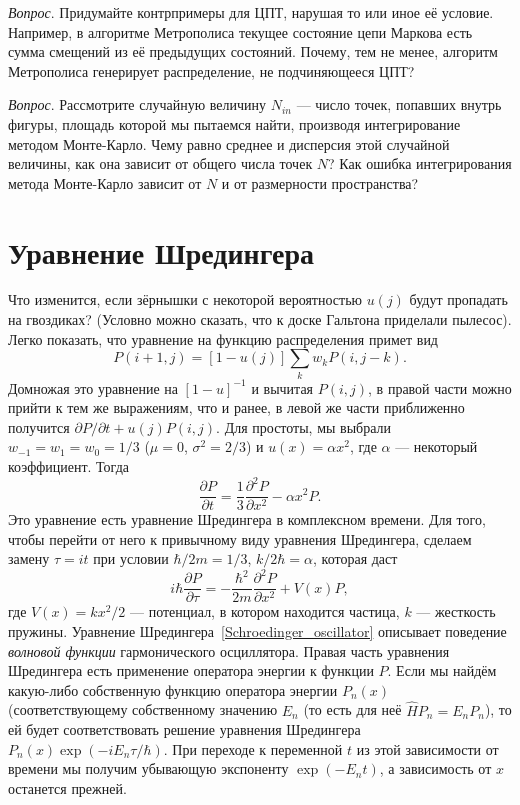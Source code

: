 \documentclass{book}
\begin{document}
\textit{Вопрос}. Придумайте контрпримеры для ЦПТ, нарушая то или иное её условие. Например, в
алгоритме Метрополиса текущее состояние цепи Маркова есть сумма смещений из её предыдущих
состояний. Почему, тем не менее, алгоритм Метрополиса генерирует распределение, не подчиняющееся
ЦПТ?

\textit{Вопрос}. Рассмотрите случайную величину $N_{in}$ --- число точек, попавших внутрь фигуры,
площадь которой мы пытаемся найти, производя интегрирование методом Монте-Карло. Чему равно среднее
и дисперсия этой случайной величины, как она зависит от общего числа точек $N$? Как ошибка
интегрирования метода Монте-Карло зависит от $N$ и от размерности пространства?

\section{Уравнение Шредингера}

Что изменится, если зёрнышки с некоторой вероятностью $u(j)$ будут пропадать на гвоздиках? (Условно
можно сказать, что к доске Гальтона приделали пылесос).  Легко показать, что уравнение на функцию
распределения примет вид
\begin{equation}
    P(i+1, j) = [1 - u(j)]\sum_k w_k P(i, j - k).
\end{equation}
Домножая это уравнение на $[1 - u]^{-1}$ и вычитая $P(i,j)$, в правой части можно прийти к тем же
выражениям, что и ранее, в левой же части приближенно получится $\partial P / \partial t + u(j)
P(i, j)$.
Для простоты, мы выбрали $w_{-1} = w_1 = w_0 = 1/3$ ($\mu = 0$, $\sigma^2 = 2/3$) и 
$u(x) = \alpha x^2$, где $\alpha$ --- некоторый коэффициент. Тогда
\begin{equation}
    \label{Feynman_board}
    \frac{\partial P}{\partial t} = \frac{1}{3} \frac{\partial^2 P}{\partial x^2} - \alpha
    x^2 P.
\end{equation}
Это уравнение есть уравнение Шредингера в комплексном времени. Для того, чтобы перейти от него к
привычному виду уравнения Шредингера, сделаем замену 
$\tau
= i t$ при условии $\hbar / 2 m = 1 / 3$, $k / 2 \hbar = \alpha$,
которая даст
\begin{equation}
    \label{Schroedinger_oscillator}
    i \hbar \frac{\partial P}{\partial \tau} = - \frac{\hbar^2}{2 m} \frac{\partial^2
    P}{\partial x^2} + V(x) P,
\end{equation}
где $V(x) = k x^2 / 2$ --- потенциал, в котором находится частица, $k$ --- жесткость пружины.
Уравнение Шредингера~\ref{Schroedinger_oscillator} описывает поведение \textit{волновой функции}
гармонического осциллятора. Правая часть уравнения Шредингера есть применение оператора энергии к
функции $P$. Если мы найдём какую-либо собственную функцию оператора энергии $P_n(x)$ (соответствующему
собственному значению $E_n$ (то есть для неё $\hat H P_n = E_n P_n$), то ей будет соответствовать
решение уравнения Шредингера $P_n(x) \exp(-i E_n \tau / \hbar)$. При переходе к переменной $t$ из
этой зависимости от времени мы
получим убывающую экспоненту $\exp(- E_n t)$, а зависимость от $x$ останется прежней.
\end{document}
